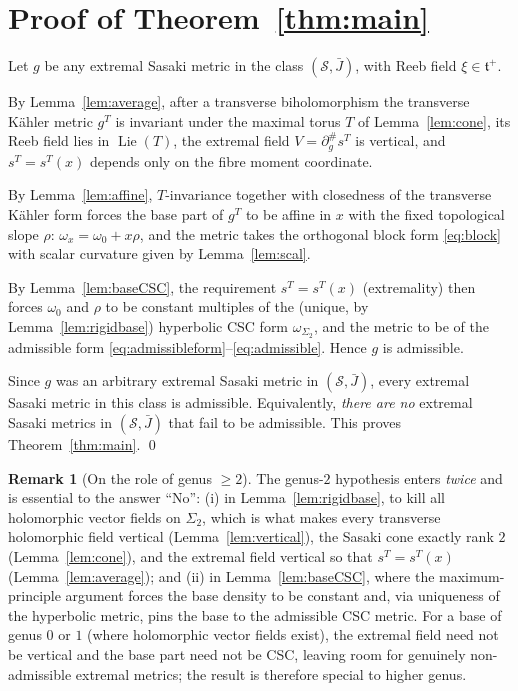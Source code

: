 \documentclass{amsart}
\theoremstyle{definition}
\newtheorem{remark}{Remark}
\DeclareMathOperator{\Lie}{Lie}
\begin{document}
\section{Proof of Theorem~\ref{thm:main}}

Let $g$ be any extremal Sasaki metric in the class $(\mathcal S,\bar J)$, with
Reeb field $\xi\in\mathfrak t^+$.

By Lemma~\ref{lem:average}, after a transverse biholomorphism the transverse
K\"ahler metric $g^T$ is invariant under the maximal torus $T$ of
Lemma~\ref{lem:cone}, its Reeb field lies in $\Lie(T)$, the extremal field
$V=\partial^\#_g s^T$ is vertical, and $s^T=s^T(x)$ depends only on the fibre
moment coordinate.

By Lemma~\ref{lem:affine}, $T$-invariance together with closedness of the
transverse K\"ahler form forces the base part of $g^T$ to be affine in $x$ with
the fixed topological slope $\rho$: $\omega_x=\omega_0+x\rho$, and the metric
takes the orthogonal block form \eqref{eq:block} with scalar curvature given by
Lemma~\ref{lem:scal}.

By Lemma~\ref{lem:baseCSC}, the requirement $s^T=s^T(x)$ (extremality) then
forces $\omega_0$ and $\rho$ to be constant multiples of the (unique, by
Lemma~\ref{lem:rigidbase}) hyperbolic CSC form $\omega_{\Sigma_2}$, and the
metric to be of the admissible form
\eqref{eq:admissibleform}--\eqref{eq:admissible}. Hence $g$ is admissible.

Since $g$ was an arbitrary extremal Sasaki metric in $(\mathcal S,\bar J)$,
every extremal Sasaki metric in this class is admissible. Equivalently,
\emph{there are no} extremal Sasaki metrics in $(\mathcal S,\bar J)$ that fail
to be admissible. This proves Theorem~\ref{thm:main}. \qed

\begin{remark}[On the role of genus $\ge2$]
The genus-$2$ hypothesis enters \emph{twice} and is essential to the answer
``No'': (i) in Lemma~\ref{lem:rigidbase}, to kill all holomorphic vector fields
on $\Sigma_2$, which is what makes every transverse holomorphic field vertical
(Lemma~\ref{lem:vertical}), the Sasaki cone exactly rank $2$
(Lemma~\ref{lem:cone}), and the extremal field vertical so that $s^T=s^T(x)$
(Lemma~\ref{lem:average}); and (ii) in Lemma~\ref{lem:baseCSC}, where the
maximum-principle argument forces the base density to be constant and, via
uniqueness of the hyperbolic metric, pins the base to the admissible CSC metric.
For a base of genus $0$ or $1$ (where holomorphic vector fields exist), the
extremal field need not be vertical and the base part need not be CSC, leaving
room for genuinely non-admissible extremal metrics; the result is therefore
special to higher genus.
\end{remark}
\end{document}
